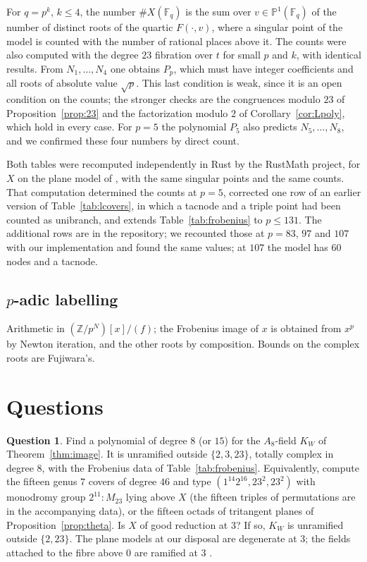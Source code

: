 \documentclass[11pt]{amsart}
\theoremstyle{definition}
\newtheorem{question}[theorem]{Question}
\newcommand{\ZZ}{\mathbb{Z}}
\newcommand{\FF}{\mathbb{F}}
\newcommand{\PP}{\mathbb{P}}
\newcommand{\M}{M_{23}}
\begin{document}
For $q=p^k$, $k\le4$, the number $\#X(\FF_q)$ is the sum over $v\in\PP^1(\FF_q)$ of the number of distinct roots of the quartic $F(\cdot,v)$, where a singular point of the model is counted with the number of rational places above it. The counts were also computed with the degree $23$ fibration over $t$ for small $p$ and $k$, with identical results. From $N_1,\dots,N_4$ one obtains $P_p$, which must have integer coefficients and all roots of absolute value $\sqrt p$. This last condition is weak, since it is an open condition on the counts; the stronger checks are the congruences modulo $23$ of Proposition~\ref{prop:23} and the factorization modulo $2$ of Corollary~\ref{cor:Lpoly}, which hold in every case. For $p=5$ the polynomial $P_5$ also predicts $N_5,\dots,N_8$, and we confirmed these four numbers by direct count.

Both tables were recomputed independently in Rust by the RustMath project, for $X$ on the plane model of \cite[Thm.~7.1]{LeLay26}, with the same singular points and the same counts. That computation determined the counts at $p=5$, corrected one row of an earlier version of Table~\ref{tab:lcovers}, in which a tacnode and a triple point had been counted as unibranch, and extends Table~\ref{tab:frobenius} to $p\le131$. The additional rows are in the repository; we recounted those at $p=83$, $97$ and $107$ with our implementation and found the same values; at $107$ the model has $60$ nodes and a tacnode.

\subsection*{$p$-adic labelling}
Arithmetic in $(\ZZ/p^N)[x]/(f)$; the Frobenius image of $x$ is obtained from $x^p$ by Newton iteration, and the other roots by composition. Bounds on the complex roots are Fujiwara's.

\section{Questions}\label{sec:questions}

\begin{question}\label{q:A8}
Find a polynomial of degree $8$ (or $15$) for the $A_8$-field $K_W$ of Theorem~\ref{thm:image}. It is unramified outside $\{2,3,23\}$, totally complex in degree $8$, with the Frobenius data of Table~\ref{tab:frobenius}. Equivalently, compute the fifteen genus $7$ covers of degree $46$ and type $(1^{14}2^{16},23^2,23^2)$ with monodromy group $2^{11}{:}\M$ lying above $X$ (the fifteen triples of permutations are in the accompanying data), or the fifteen octads of tritangent planes of Proposition~\ref{prop:theta}. Is $X$ of good reduction at $3$? If so, $K_W$ is unramified outside $\{2,23\}$. The plane models at our disposal are degenerate at $3$; the fields attached to the fibre above $0$ are ramified at $3$ \cite[Thm.~8.14]{LeLay26}.
\end{question}
\end{document}

